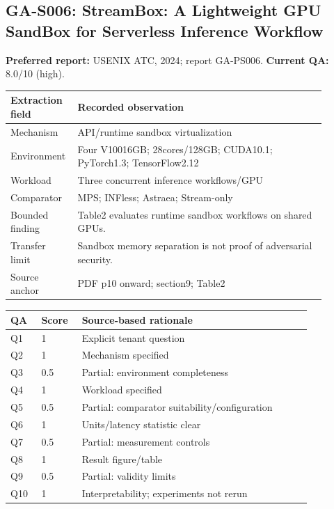\subsection{GA-S006: StreamBox: A Lightweight GPU SandBox for Serverless Inference Workflow}
\textbf{Preferred report:} USENIX ATC, 2024; report GA-PS006. \textbf{Current QA:} 8.0/10 (high).
\begin{longtable}{P{0.15\linewidth}P{0.75\linewidth}}
\toprule Extraction field & Recorded observation\\\midrule\endhead
Mechanism & API/runtime sandbox virtualization\\
Environment & Four V10016GB; 28cores/128GB; CUDA10.1; PyTorch1.3; TensorFlow2.12\\
Workload & Three concurrent inference workflows/GPU\\
Comparator & MPS; INFless; Astraea; Stream-only\\
Bounded finding & Table2 evaluates runtime sandbox workflows on shared GPUs.\\
Transfer limit & Sandbox memory separation is not proof of adversarial security.\\
Source anchor & PDF p10 onward; section9; Table2\\
\bottomrule\end{longtable}
\begin{longtable}{P{0.09\linewidth}P{0.10\linewidth}P{0.67\linewidth}}
\toprule QA & Score & Source-based rationale\\\midrule\endhead
Q1 & 1 & Explicit tenant question\\
Q2 & 1 & Mechanism specified\\
Q3 & 0.5 & Partial: environment completeness\\
Q4 & 1 & Workload specified\\
Q5 & 0.5 & Partial: comparator suitability/configuration\\
Q6 & 1 & Units/latency statistic clear\\
Q7 & 0.5 & Partial: measurement controls\\
Q8 & 1 & Result figure/table\\
Q9 & 0.5 & Partial: validity limits\\
Q10 & 1 & Interpretability; experiments not rerun\\
\bottomrule\end{longtable}

